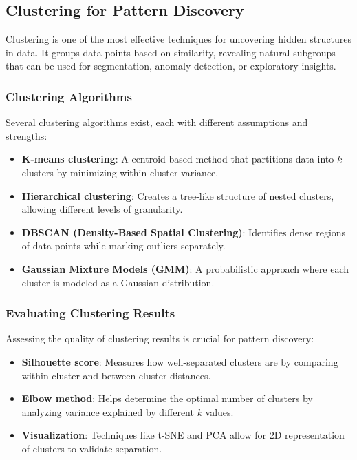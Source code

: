 \documentclass[12pt,openany]{book}
\begin{document}
\subsection{Clustering for Pattern Discovery}

Clustering is one of the most effective techniques for uncovering hidden structures in data. It groups data points based on similarity, revealing natural subgroups that can be used for segmentation, anomaly detection, or exploratory insights.

\subsubsection{Clustering Algorithms}

Several clustering algorithms exist, each with different assumptions and strengths:
\begin{itemize}
    \item \textbf{K-means clustering}: A centroid-based method that partitions data into \( k \) clusters by minimizing within-cluster variance.
    \item \textbf{Hierarchical clustering}: Creates a tree-like structure of nested clusters, allowing different levels of granularity.
    \item \textbf{DBSCAN (Density-Based Spatial Clustering)}: Identifies dense regions of data points while marking outliers separately.
    \item \textbf{Gaussian Mixture Models (GMM)}: A probabilistic approach where each cluster is modeled as a Gaussian distribution.
\end{itemize}

\subsubsection{Evaluating Clustering Results}

Assessing the quality of clustering results is crucial for pattern discovery:
\begin{itemize}
    \item \textbf{Silhouette score}: Measures how well-separated clusters are by comparing within-cluster and between-cluster distances.
    \item \textbf{Elbow method}: Helps determine the optimal number of clusters by analyzing variance explained by different \( k \) values.
    \item \textbf{Visualization}: Techniques like t-SNE and PCA allow for 2D representation of clusters to validate separation.
\end{itemize}
\end{document}
